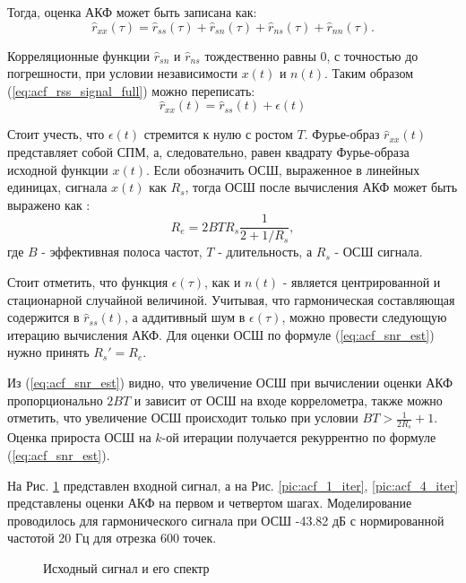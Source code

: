 Тогда, оценка АКФ может быть записана как:
\begin{equation}
	\label{eq:acf_rss_signal_full}
	\hat{r}_{xx}(\tau)=\hat{r}_{ss}(\tau)+\hat{r}_{sn}(\tau)+\hat{r}_{ns}(\tau) + \hat{r}_{nn}(\tau).
\end{equation}

Корреляционные функции ${\hat{r}_{sn}}$ и ${\hat{r}_{ns}}$ тождественно равны 0, с точностью до погрешности, при условии независимости
${x(t)}$ и ${n(t)}$. Таким образом (\ref{eq:acf_rss_signal_full}) можно переписать:
\begin{equation}
	\label{eq:acf_rss_signal_new}
	\hat{r}_{xx}(t) = \hat{r}_{ss}(t) + \epsilon (t)
\end{equation}

Стоит учесть, что ${\epsilon (t)}$ стремится к нулю с ростом ${T}$. Фурье-образ ${\hat{r}_{xx}(t)}$
представляет собой СПМ, а, следовательно, равен квадрату Фурье-образа исходной функции ${x(t)}$.
Если обозначить ОСШ, выраженное в линейных единицах, сигнала ${x(t)}$ как ${R_s}$, тогда ОСШ после вычисления АКФ может быть выражено 
как \cite{book_max}:
\begin{equation}
	\label{eq:acf_snr_est}
	R_e=2BTR_s \frac{1}{2+1/R_s},
\end{equation}
где ${B}$ - эффективная полоса частот, ${T}$ - длительность, а ${R_s}$ - ОСШ сигнала.

Стоит отметить, что функция ${\epsilon(\tau)}$, как и ${n(t)}$ - является центрированной и
стационарной случайной величиной.
Учитывая, что гармоническая составляющая содержится в ${\hat{r}_{ss}(t)}$, а аддитивный шум в ${\epsilon(\tau)}$, можно провести
следующую итерацию вычисления АКФ. Для оценки ОСШ по формуле (\ref{eq:acf_snr_est}) нужно принять ${R_s' = R_e}$.

Из (\ref{eq:acf_snr_est}) видно, что увеличение ОСШ при вычислении оценки АКФ пропорционально ${2BT}$ и зависит от
ОСШ на входе коррелометра, также можно отметить, что увеличение ОСШ происходит только при условии ${BT > \frac{1}{2R_s} + 1}$.
Оценка прироста ОСШ на ${k}$-ой итерации получается рекуррентно по формуле (\ref{eq:acf_snr_est}).

На Рис. \ref{pic:acf_0_iter} представлен входной сигнал, а на
Рис. \ref{pic:acf_1_iter}, \ref{pic:acf_4_iter} представлены оценки АКФ на первом и четвертом шагах.
Моделирование проводилось для гармонического сигнала при ОСШ -43.82 дБ с нормированной частотой 20 Гц для
отрезка 600 точек.

\begin{figure}[h]
	\center{}
	\caption{Исходный сигнал и его спектр}
	\label{pic:acf_0_iter}
\end{figure}

